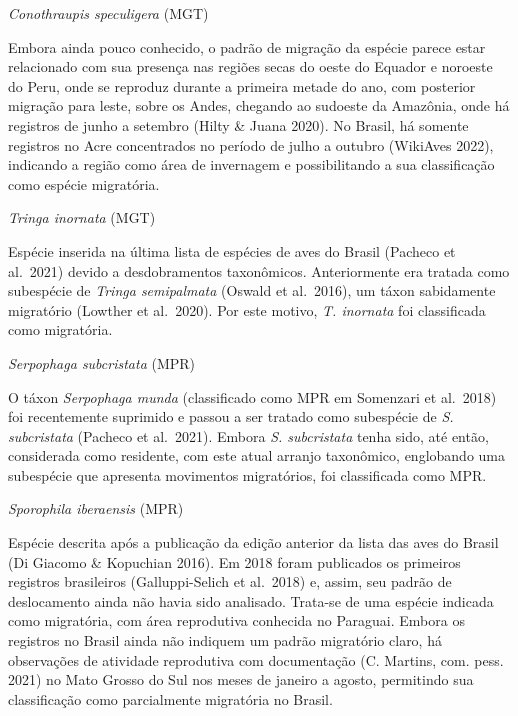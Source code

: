 \documentclass[
  oneside]{scrbook}
\begin{document}
\begin{blackbox}
\emph{Conothraupis speculigera} (MGT)

Embora ainda pouco conhecido, o padrão de migração da espécie parece estar relacionado com sua presença nas regiões secas do oeste do Equador e noroeste do Peru, onde se reproduz durante a primeira metade do ano, com posterior migração para leste, sobre os Andes, chegando ao sudoeste da Amazônia, onde há registros de junho a setembro (Hilty \& Juana 2020). No Brasil, há somente registros no Acre concentrados no período de julho a outubro (WikiAves 2022), indicando a região como área de invernagem e possibilitando a sua classificação como espécie migratória.

\end{blackbox}

\begin{blackbox}
\emph{Tringa inornata} (MGT)

Espécie inserida na última lista de espécies de aves do Brasil (Pacheco et al.~2021) devido a desdobramentos taxonômicos. Anteriormente era tratada como subespécie de \emph{Tringa semipalmata} (Oswald et al.~2016), um táxon sabidamente migratório (Lowther et al.~2020). Por este motivo, \emph{T. inornata} foi classificada como migratória.

\end{blackbox}

\begin{blackbox}
\emph{Serpophaga subcristata} (MPR)

O táxon \emph{Serpophaga munda} (classificado como MPR em Somenzari et al.~2018) foi recentemente suprimido e passou a ser tratado como subespécie de \emph{S. subcristata} (Pacheco et al.~2021). Embora \emph{S. subcristata} tenha sido, até então, considerada como residente, com este atual arranjo taxonômico, englobando uma subespécie que apresenta movimentos migratórios, foi classificada como MPR.

\end{blackbox}

\begin{blackbox}
\emph{Sporophila iberaensis} (MPR)

Espécie descrita após a publicação da edição anterior da lista das aves do Brasil (Di Giacomo \& Kopuchian 2016). Em 2018 foram publicados os primeiros registros brasileiros (Galluppi-Selich et al.~2018) e, assim, seu padrão de deslocamento ainda não havia sido analisado. Trata-se de uma espécie indicada como migratória, com área reprodutiva conhecida no Paraguai. Embora os registros no Brasil ainda não indiquem um padrão migratório claro, há observações de atividade reprodutiva com documentação (C. Martins, com. pess. 2021) no Mato Grosso do Sul nos meses de janeiro a agosto, permitindo sua classificação como parcialmente migratória no Brasil.

\end{blackbox}
\end{document}
